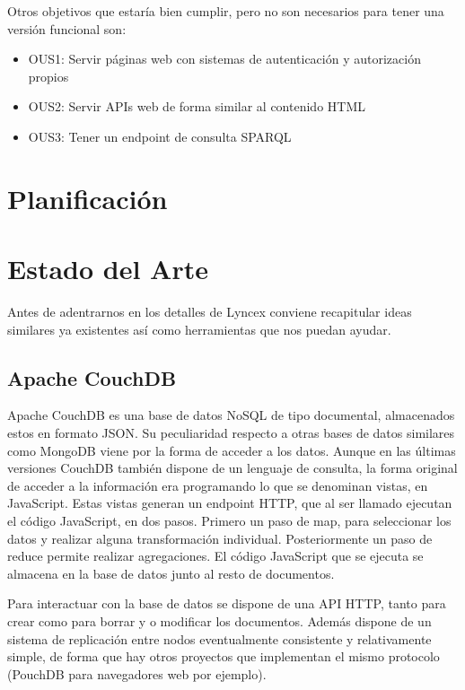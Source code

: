 \documentclass[12pt]{report} %
\begin{document}
Otros objetivos que estaría bien cumplir, pero no son necesarios para tener una versión funcional son:
\begin{itemize}
    \item OUS1: Servir páginas web con sistemas de autenticación y autorización propios
    \item OUS2: Servir APIs web de forma similar al contenido HTML
    \item OUS3: Tener un endpoint de consulta SPARQL
\end{itemize}

\chapter{Planificación}

\chapter{Estado del Arte}

Antes de adentrarnos en los detalles de Lyncex conviene recapitular ideas similares ya existentes así como herramientas que nos puedan ayudar. 

\section{Apache CouchDB}
Apache CouchDB es una base de datos NoSQL de tipo documental, almacenados estos en formato JSON.\cite{couchdb}
Su peculiaridad respecto a otras bases de datos similares como MongoDB viene por la forma de acceder a los datos.
Aunque en las últimas versiones CouchDB también dispone de un lenguaje de consulta, la forma original de acceder a la información era programando lo que se denominan vistas, en JavaScript.
Estas vistas generan un endpoint HTTP, que al ser llamado ejecutan el código JavaScript, en dos pasos. Primero un paso de map, para seleccionar los datos y realizar alguna transformación individual.
Posteriormente un paso de reduce permite realizar agregaciones. El código JavaScript que se ejecuta se almacena en la base de datos junto al resto de documentos.

Para interactuar con la base de datos se dispone de una API HTTP, tanto para crear como para borrar y o modificar los documentos.
Además dispone de un sistema de replicación entre nodos eventualmente consistente y relativamente simple, de forma que hay otros proyectos que implementan el mismo protocolo (PouchDB para navegadores web por ejemplo).
\end{document}
